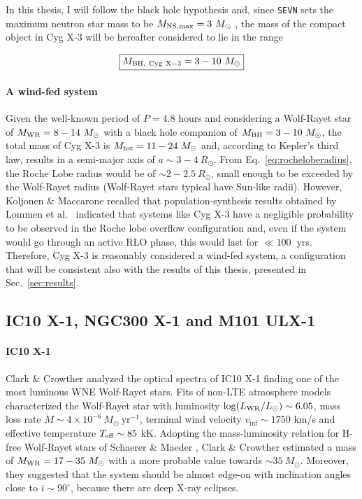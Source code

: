 \documentclass[a4paper,titlepage]{book}     	%
\newcommand{\sun}{\ensuremath{_\odot}}
\newcommand{\mdot}{\ensuremath{\dot{M}}}
\newcommand{\msun}{\ensuremath{M\sun}}
\newcommand{\rsun}{R_{\odot}}
\newcommand{\lsun}{L_{\odot}}
\newcommand{\yr}{\text{yr}}
\newcommand{\mwr}{\ensuremath{M_\textup{WR}}}
\newcommand{\mbh}{\ensuremath{M_\textup{BH}}}
\begin{document}
In this thesis, I will follow the black hole hypothesis and, since \texttt{SEVN} sets the maximum neutron star mass to be  $M_{\rm NS,max} = 3~\msun$ \cite{spera2019_mergingBBH}, the mass of the compact object in Cyg X-3 will be hereafter considered to lie in the range

\begin{equation}\label{eq:MBHCygX3}
    \boxed{M_{\rm BH,~Cyg~X-3} = 3-10~\msun}
\end{equation}

\paragraph{A wind-fed system} Given the well-known period of $P=4.8$ hours and considering a Wolf-Rayet star of $\mwr = 8-14~\msun$ with a black hole companion of $\mbh = 3-10~\msun$, the total mass of Cyg X-3 is $M_{\rm tot} = 11 - 24~\msun$ and, according to Kepler's third law, results in a semi-major axis of $a \sim 3-4~\rsun$. From Eq.\ \ref{eq:rocheloberadius}, the Roche Lobe radius would be of $\sim 2-2.5~\rsun$, small enough to be exceeded by the Wolf-Rayet radius (Wolf-Rayet stars typical have Sun-like radii). However, Koljonen \& Maccarone \cite{CygX-3_Koljonen2017} recalled that population-synthesis results obtained by Lommen et al.\ \cite{CygX-3_Lommen2005_Ppdot} indicated that systems like Cyg X-3 have a negligible probability to be observed in the Roche lobe overflow configuration and, even if the system would go through an active RLO phase, this would last for $\ll 100~$ yrs. Therefore, Cyg X-3 is reasonably considered a wind-fed system, a configuration that will be consistent also with the results of this thesis, presented in Sec.\ \ref{sec:results}. 




\subsection{IC10 X-1, NGC300 X-1 and M101 ULX-1}\label{subsec:IC10X1_revisedmasses}

\paragraph{IC10 X-1} Clark \& Crowther \cite{IC10X-1_Clark2004_WRmass} analyzed the optical spectra of IC10 X-1 finding one of the most luminous WNE Wolf-Rayet stars. Fits of non-LTE atmosphere models characterized the Wolf-Rayet star with luminosity $\log(L_{\rm WR}/\lsun) \sim 6.05$, mass loss rate $\mdot \sim 4 \times 10^{-6}~\msun~\yr^{-1}$, terminal wind velocity $v_{\inf} \sim 1750$ km/s and effective temperature $T_{\rm eff} \sim 85$ kK. Adopting the mass-luminosity relation for H-free Wolf-Rayet stars of Schaerer \& Maeder \cite{schaerer1992MLrelationWR}, Clark \& Crowther estimated a mass of $\mwr = 17-35~\msun$ with a more probable value towards $\sim 35~\msun$. Moreover, they suggested that the system should be almost edge-on with inclination angles close to $i \sim 90^{\circ}$, because there are deep X-ray eclipses.
\end{document}
